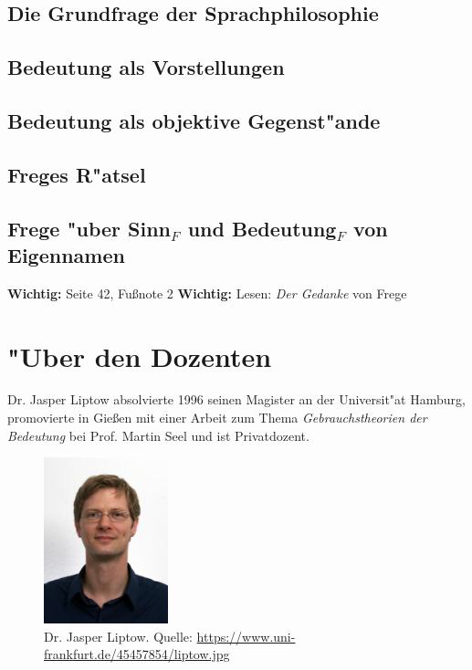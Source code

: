 \documentclass[]{scrartcl}
\begin{document}
\subsection{Die Grundfrage der Sprachphilosophie}

\subsection{Bedeutung als Vorstellungen}

\subsection{Bedeutung als objektive Gegenst"ande}

\subsection{Freges R"atsel}

\subsection{Frege "uber Sinn$_{F}$ und Bedeutung$_{F}$ von Eigennamen}

\textbf{Wichtig:} Seite 42, Fu\ss note 2
\textbf{Wichtig:} Lesen: \emph{Der Gedanke }von Frege
\newpage
\section{"Uber den Dozenten}
Dr. Jasper Liptow absolvierte 1996 seinen Magister an der Universit"at Hamburg, promovierte in Gie\ss en mit einer Arbeit zum Thema \emph{Gebrauchstheorien der Bedeutung} bei Prof. Martin Seel und ist Privatdozent.


\begin{figure}[]
	\centering
	\includegraphics[width=0.32\textwidth]{images/liptow.jpg}
	\caption{Dr. Jasper Liptow. Quelle: \url{https://www.uni-frankfurt.de/45457854/liptow.jpg}}
	\label{fig:liptow}
\end{figure}

\end{document}
